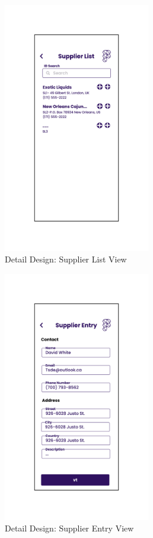 \documentclass[../thesis.tex]{subfiles}
\begin{document}
\begin{figure}[H]
    \centering
    \includegraphics[width=0.57\textwidth]{images/DetailedDesign_Supplier_List.png}
    \caption{Detail Design: Supplier List View}
    \label{fig:DetailedDesign_Supplier_List}
\end{figure}

\begin{figure}[H]
    \centering
    \includegraphics[width=0.57\textwidth]{images/DetailedDesign_Supplier_Entry.png}
    \caption{Detail Design: Supplier Entry View}
    \label{fig:DetailedDesign_Supplier_Entry}
\end{figure}
\end{document}
